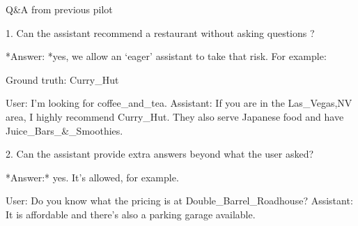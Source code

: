 \documentclass[11pt,a4paper]{article}
\begin{document}
Q&A from previous pilot

1. Can the assistant recommend a restaurant without asking questions ?

*Answer: *yes, we allow an ‘eager’ assistant to take that risk. For example:

Ground truth: Curry_Hut

User: I'm looking for coffee_and_tea.
Assistant: If you are in the Las_Vegas,NV area, I highly recommend Curry_Hut. They also serve Japanese food and have Juice_Bars_&_Smoothies.

2. Can the assistant provide extra answers beyond what the user asked?

*Answer:* yes. It’s allowed, for example.

User: Do you know what the pricing is at Double_Barrel_Roadhouse?
Assistant: It is affordable and there's also a parking garage available.
\fi
\end{document}
